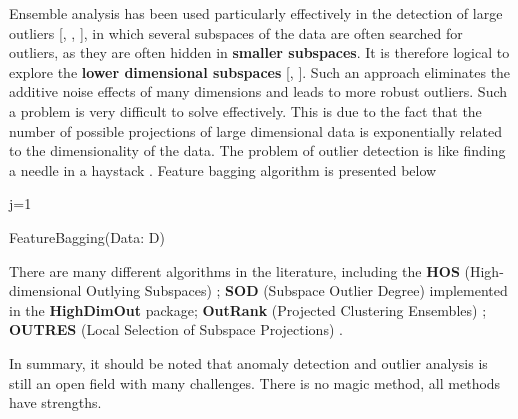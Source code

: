 Ensemble analysis has been used particularly effectively in the detection of large outliers [\cite{A8}, \cite{A13}, \cite{A14}], in which several subspaces of the data are often searched for outliers, as they are often hidden in \textbf{smaller subspaces}. It is therefore logical to explore the \textbf{lower dimensional subspaces} [\cite{A1}, \cite{A2}]. Such an approach eliminates the additive noise effects of many dimensions and leads to more robust outliers. Such a problem is very difficult to solve effectively. This is due to the fact that the number of possible projections of large dimensional data is exponentially related to the dimensionality of the data. The problem of outlier detection is like finding a needle in a haystack \cite{A14}.
Feature bagging algorithm is presented below
\begin{algorithm}
\SetAlgoLined
j=1\;
\caption{FeatureBagging(Data: D)}
\end{algorithm}

\noindent There are many different algorithms in the literature, including the \textbf{HOS} (High-dimensional Outlying Subspaces) \cite{Zhang}; \textbf{SOD} (Subspace Outlier Degree) \cite{Zi} implemented in the \textbf{HighDimOut} package; \textbf{OutRank} (Projected Clustering Ensembles) \cite{M1}; \textbf{OUTRES} (Local Selection of Subspace Projections) \cite{M3}.

In summary, it should be noted that anomaly detection and outlier analysis is still an open field with many challenges. There is no magic method, all methods have strengths. 